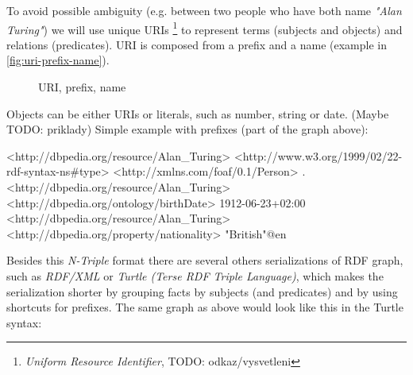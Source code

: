 \documentclass[a4paper, 12pt, twoside]{fithesis2}		%
\renewcommand{\_}{\leavevmode \kern0.07em\vbox{\hrule width0.4em}}
\begin{document}
To avoid possible ambiguity (e.g. between two people who have both name \textit{"Alan Turing"})
we will use unique URIs%
\footnote{\emph{Uniform Resource Identifier}, TODO: odkaz/vysvetleni}
to represent terms (subjects and objects) and relations (predicates).
URI is composed from a prefix and a name (example in \autoref{fig:uri-prefix-name}).


\begin{figure}[H]
  \centering
{}
  \caption{URI, prefix, name}
  \label{fig:uri-prefix-name}
\end{figure}

\noindent
Objects can be either URIs or literals, such as number, string or date. (Maybe TODO: priklady)
Simple example with prefixes (part of the graph above):

\begin{code}
<http://dbpedia.org/resource/Alan_Turing>
    <http://www.w3.org/1999/02/22-rdf-syntax-ns#type>
    <http://xmlns.com/foaf/0.1/Person> .
<http://dbpedia.org/resource/Alan_Turing>
    <http://dbpedia.org/ontology/birthDate>
    1912-06-23+02:00
<http://dbpedia.org/resource/Alan_Turing>
   <http://dbpedia.org/property/nationality>
   "British"@en
\end{code}

Besides this \textit{N-Triple} format
\cite[][68]{semantic-web}
there are several others serializations of RDF graph, such as \textit{RDF/XML}
\cite[][73]{semantic-web}
or \emph{Turtle (Terse RDF Triple Language)},
which makes the serialization shorter by grouping facts by subjects (and predicates) and by using shortcuts for prefixes. The same graph as above would look like this in the Turtle syntax:
\end{document}
